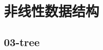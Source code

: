 \documentclass{beamer}
\begin{document}
\section{非线性数据结构}
\subsection{03-tree}
% 
% 
% 
% 
\end{document}
